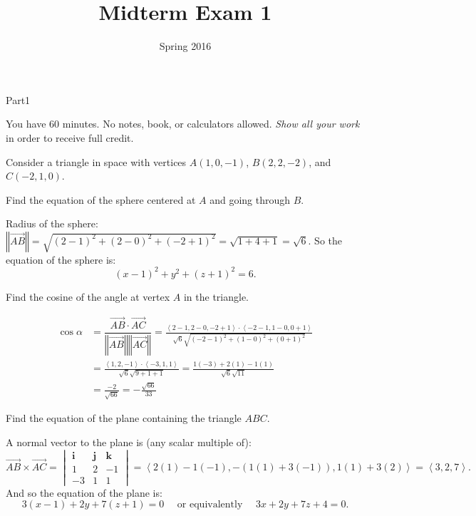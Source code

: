 \documentclass{report}
\title[MT1]{Midterm Exam 1} %
\date{Spring 2016}
\newcommand{\norm}[1]{\left\Vert #1 \right\Vert}
\newcommand{\avec}[1]{\left\langle #1 \right\rangle}
\newcommand{\vect}[1]{\overrightarrow{#1}}
\begin{document}
\maketitle

\begin{exam}{Part1}
\begin{instructions}
You have 60 minutes. No notes, book, or calculators allowed. \emph{Show all your work} in order to receive full credit.
\end{instructions}

\begin{problem*}[\auto] Consider a triangle in space with vertices $A(1,0,-1)$, $B(2,2,-2)$, and $C(-2,1,0)$.


\begin{parts}
	\item{} Find the equation of the sphere centered at $A$ and going through $B$.
	\begin{solution}[1in]
	Radius of the sphere: $\norm{\vect{AB}}= \sqrt{(2-1)^2+(2-0)^2+(-2+1)^2}=\sqrt{1+4+1}=\sqrt{6}$. So the equation of the sphere is:
	$$\boxed{(x-1)^2+y^2+(z+1)^2=6}. $$
		\end{solution}
		\item{} Find the cosine of the angle at vertex $A$ in the triangle.
		\begin{solution}[1.5in]\begin{align*}
		\cos \alpha &= \dfrac{\vect{AB}\cdot\vect{AC}}{\norm{\vect{AB}}\norm{\vect{AC}}}=\frac{\avec{2-1,2-0,-2+1}\cdot\avec{-2-1,1-0,0+1}}{\sqrt{6}\sqrt{(-2-1)^2+(1-0)^2+(0+1)^2}}\\
		&=\frac{\avec{1,2,-1}\cdot\avec{-3,1,1}}{\sqrt{6}\sqrt{9+1+1}}=\frac{1(-3)+2(1)-1(1)}{\sqrt{6}\sqrt{11}}\\
		&=\frac{-2}{\sqrt{66}}=\boxed{-\frac{\sqrt{66}}{33}}
		\end{align*}
		\end{solution}
\item{} Find the equation of the plane containing the triangle $ABC$.
\begin{solution}[1.75in] A normal vector to the plane is (any scalar multiple of):
$$\vect{AB}\times\vect{AC}=\begin{vmatrix}\mathbf{i} & \mathbf{j} & \mathbf{k}\\
1& 2 & -1\\
-3 & 1 & 1 \end{vmatrix}=\avec{2(1)-1(-1),-(1(1)+3(-1)),1(1)+3(2)}=\avec{3,2,7}. $$
And so the equation of the plane is:
$$\boxed{3(x-1)+2y+7(z+1)=0} \quad\text{ or equivalently }\quad\boxed{3x+2y+7z+4=0}.$$
\end{solution}


\end{parts}
\end{problem*}
\end{exam}
\end{document}
